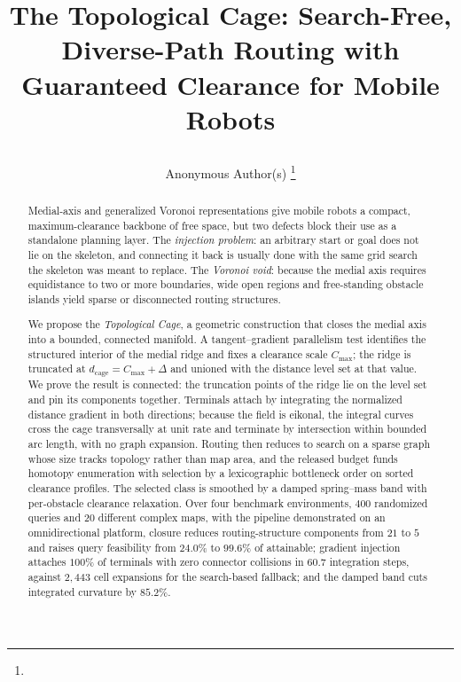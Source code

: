 \documentclass[conference]{IEEEtran}
\begin{document}
\title{\LARGE \bf


The Topological Cage: Search-Free, Diverse-Path Routing with Guaranteed Clearance for Mobile Robots
}

\author{Anonymous Author(s)
\thanks{         }%
}

\maketitle
\thispagestyle{empty}
\pagestyle{empty}

\begin{abstract}
Medial-axis and generalized Voronoi representations give mobile robots a compact, maximum-clearance backbone of free space, but two defects block their use as a standalone planning layer. The \emph{injection problem}: an arbitrary start or goal does not lie on the skeleton, and connecting it back is usually done with the same grid search the skeleton was meant to replace. The \emph{Voronoi void}: because the medial axis requires equidistance to two or more boundaries, wide open regions and free-standing obstacle islands yield sparse or disconnected routing structures.

We propose the \emph{Topological Cage}, a geometric construction that closes the medial axis into a bounded, connected manifold. A tangent--gradient parallelism test identifies the structured interior of the medial ridge and fixes a clearance scale $C_{\max}$; the ridge is truncated at $d_{\mathrm{cage}}=C_{\max}+\Delta$ and unioned with the distance level set at that value. We prove the result is connected: the truncation points of the ridge lie on the level set and pin its components together. Terminals attach by integrating the normalized distance gradient in both directions; because the field is eikonal, the integral curves cross the cage transversally at unit rate and terminate by intersection within bounded arc length, with no graph expansion. Routing then reduces to search on a sparse graph whose size tracks topology rather than map area, and the released budget funds homotopy enumeration with selection by a lexicographic bottleneck order on sorted clearance profiles. The selected class is smoothed by a damped spring--mass band with per-obstacle clearance relaxation. Over four benchmark environments, $400$ randomized queries and 20 different complex maps, with the pipeline demonstrated on an omnidirectional platform, closure reduces routing-structure components from $21$ to $5$ and raises query feasibility from $24.0\%$ to $99.6\%$ of attainable; gradient injection attaches $100\%$ of terminals with zero connector collisions in $60.7$ integration steps, against $2{,}443$ cell expansions for the search-based fallback; and the damped band cuts integrated curvature by $85.2\%$.
\end{abstract}
\end{document}
